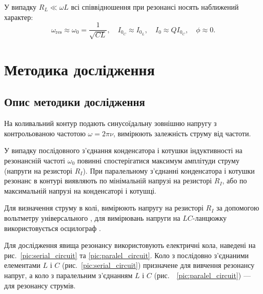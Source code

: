 \documentclass[]{LabWork}
\begin{document}
\begin{center}
\begin{minipage}{0.75\linewidth}
		\label{plt:P-AFC-URLC}
	\end{minipage}
\end{center}

У випадку $R_L \ll \omega L$ всі співвідношення при резонансі носять наближений характер:
\begin{equation*}
	\omega_{\mathrm{res}} \approx \omega_0 = \frac{1}{\sqrt{CL}},   \quad  I_{0_C}   \approx I_{0_L}, \quad 	I_0 \approx Q I_{0_C}, 	\quad \phi   \approx 0.
\end{equation*}

\section{Методика дослідження}

\subsection{Опис методики дослідження}


На коливальний контур подають синусоїдальну зовнішню напругу з контрольованою частотою $\omega = 2\pi \nu$, вимірюють залежність струму від частоти.

У випадку послідовного з'єднання конденсатора і котушки індуктивності на резонансній частоті $\omega_0$ повинні спостерігатися максимум амплітуди струму (напруги на резисторі $R_I$). При паралельному з'єднанні конденсатора і котушки резонанс в контурі виявляють по мінімальній напрузі на резисторі $R_I$, або по максимальній напрузі на конденсаторі і котушці.

Для визначення струму в колі, вимірюють напругу на резисторі $R_I$ за допомогою вольтметру універсального , для вимірювань напруги на $LC$-ланцюжку використовується осцилограф .

Для дослідження явища резонансу використовують електричні кола, наведені на рис.~\ref{pic:serial_circuit} та \ref{pic:paralel_circuit}. Коло з послідовно з'єднаними елементами $L$ і $C$ (рис.~\ref{pic:serial_circuit}) призначене для вивчення резонансу напруг, а коло з паралельним з'єднанням  $L$ і $C$ (рис.~~\ref{pic:paralel_circuit}) --- для резонансу струмів.
\end{document}

